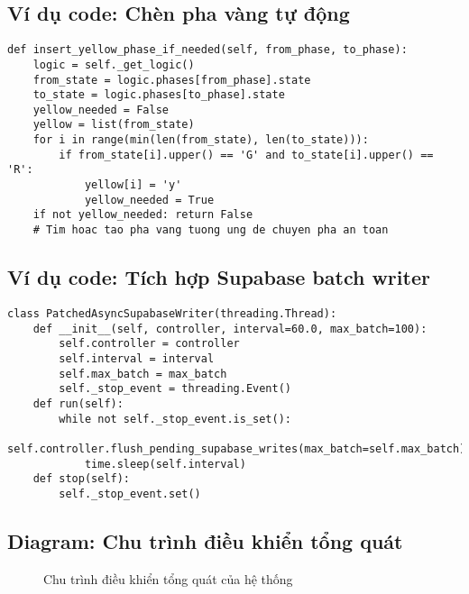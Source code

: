 \subsection{Ví dụ code: Chèn pha vàng tự động}
\begin{lstlisting}[style=py,caption={Chèn pha vàng khi chuyển pha nguy hiểm}]
def insert_yellow_phase_if_needed(self, from_phase, to_phase):
    logic = self._get_logic()
    from_state = logic.phases[from_phase].state
    to_state = logic.phases[to_phase].state
    yellow_needed = False
    yellow = list(from_state)
    for i in range(min(len(from_state), len(to_state))):
        if from_state[i].upper() == 'G' and to_state[i].upper() == 'R':
            yellow[i] = 'y'
            yellow_needed = True
    if not yellow_needed: return False
    # Tim hoac tao pha vang tuong ung de chuyen pha an toan
\end{lstlisting}

\subsection{Ví dụ code: Tích hợp Supabase batch writer}
\begin{lstlisting}[style=py,caption={Đồng bộ dữ liệu lên Supabase bất đồng bộ}]
class PatchedAsyncSupabaseWriter(threading.Thread):
    def __init__(self, controller, interval=60.0, max_batch=100):
        self.controller = controller
        self.interval = interval
        self.max_batch = max_batch
        self._stop_event = threading.Event()
    def run(self):
        while not self._stop_event.is_set():
            self.controller.flush_pending_supabase_writes(max_batch=self.max_batch)
            time.sleep(self.interval)
    def stop(self):
        self._stop_event.set()
\end{lstlisting}

\subsection{Diagram: Chu trình điều khiển tổng quát}
\begin{figure}[H]
    \centering
    \caption{Chu trình điều khiển tổng quát của hệ thống}
    \label{fig:main_control_loop}
\end{figure}
